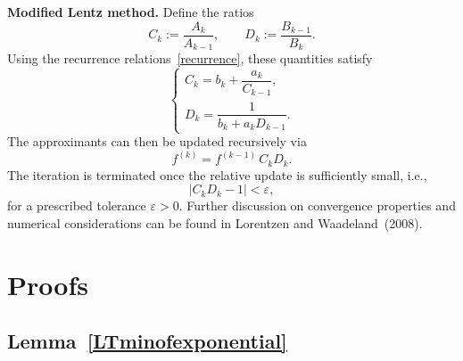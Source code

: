 \documentclass[11pt]{article}
\begin{document}
\noindent
\textbf{Modified Lentz method.}
Define the ratios
\begin{equation}
    C_k := \frac{A_k}{A_{k-1}},
    \qquad
    D_k := \frac{B_{k-1}}{B_k}.
\end{equation}
Using the recurrence relations~\eqref{recurrence}, these quantities satisfy
\begin{equation}
    \begin{cases}
        C_k = b_k + \dfrac{a_k}{C_{k-1}},\\[1em]
        D_k = \dfrac{1}{b_k + a_k D_{k-1}}.
    \end{cases}
\end{equation}
The approximants can then be updated recursively via
\begin{equation}
    f^{(k)} = f^{(k-1)}\,C_k D_k.
\end{equation}
The iteration is terminated once the relative update is sufficiently small, i.e.,
\begin{equation}
    \bigl|C_k D_k - 1\bigr| < \varepsilon,
\end{equation}
for a prescribed tolerance $\varepsilon>0$. Further discussion on convergence properties and numerical considerations can be found in Lorentzen and Waadeland~(2008).


\section{Proofs}\label{proofappendix}
\subsection{Lemma~\ref{LTminofexponential}}
\end{document}
